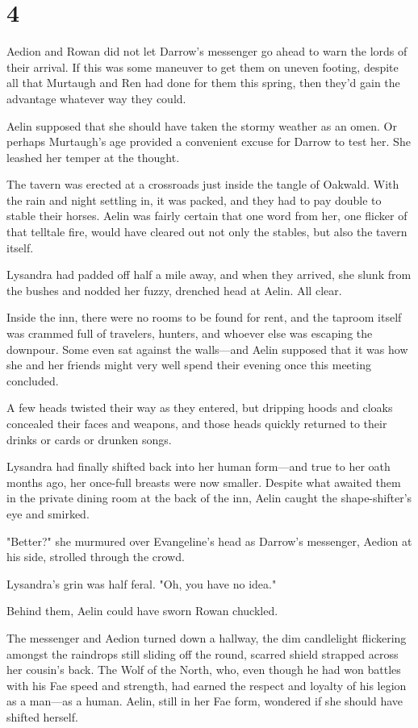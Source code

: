 
\chapter{4}

Aedion and Rowan did not let Darrow's messenger go ahead to warn the lords of their arrival. If this was some maneuver to get them on uneven footing, despite all that Murtaugh and Ren had done for them this spring, then they'd gain the advantage whatever way they could.

Aelin supposed that she should have taken the stormy weather as an omen. Or perhaps Murtaugh's age provided a convenient excuse for Darrow to test her. She leashed her temper at the thought.

The tavern was erected at a crossroads just inside the tangle of Oakwald. With the rain and night settling in, it was packed, and they had to pay double to stable their horses. Aelin was fairly certain that one word from her, one flicker of that telltale fire, would have cleared out not only the stables, but also the tavern itself.

Lysandra had padded off half a mile away, and when they arrived, she slunk from the bushes and nodded her fuzzy, drenched head at Aelin. All clear.

Inside the inn, there were no rooms to be found for rent, and the taproom itself was crammed full of travelers, hunters, and whoever else was escaping the downpour. Some even sat against the walls---and Aelin supposed that it was how she and her friends might very well spend their evening once this meeting concluded.

A few heads twisted their way as they entered, but dripping hoods and cloaks concealed their faces and weapons, and those heads quickly returned to their drinks or cards or drunken songs.

Lysandra had finally shifted back into her human form---and true to her oath months ago, her once-full breasts were now smaller. Despite what awaited them in the private dining room at the back of the inn, Aelin caught the shape-shifter's eye and smirked.

"Better?" she murmured over Evangeline's head as Darrow's messenger, Aedion at his side, strolled through the crowd.

Lysandra's grin was half feral. "Oh, you have no idea."

Behind them, Aelin could have sworn Rowan chuckled.

The messenger and Aedion turned down a hallway, the dim candlelight flickering amongst the raindrops still sliding off the round, scarred shield strapped across her cousin's back. The Wolf of the North, who, even though he had won battles with his Fae speed and strength, had earned the respect and loyalty of his legion as a man---as a human. Aelin, still in her Fae form, wondered if she should have shifted herself.

